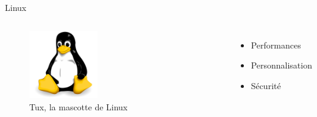\documentclass[aspectratio=169,xcolor=dvipsnames]{beamer}
\begin{document}
\begin{frame}{Linux}
    \begin{columns}[c] %

        \begin{figure}
            \includegraphics[width=0.4\textwidth]{images/tux.png}
            \captionsetup{labelformat=empty}
            \caption{Tux, la mascotte de Linux}
        \end{figure}

        \begin{itemize}
            \item Performances
            \item Personnalisation
            \item Sécurité
        \end{itemize}

    \end{columns}
\end{frame}

\end{document}
